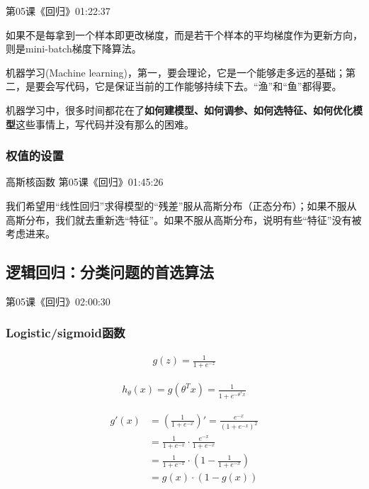 \documentclass[UTF8]{ctexbook}
\begin{document}
第05课《回归》01:22:37

如果不是每拿到一个样本即更改梯度，而是若干个样本的平均梯度作为更新方向，则是mini-batch梯度下降算法。

机器学习(Machine learning)，第一，要会理论，它是一个能够走多远的基础；第二，是要会写代码，它是保证当前的工作能够持续下去。“渔”和“鱼”都得要。

机器学习中，很多时间都花在了\textbf{如何建模型、如何调参、如何选特征、如何优化模型}这些事情上，写代码并没有那么的困难。

\subsubsection{权值的设置}

高斯核函数 第05课《回归》01:45:26

我们希望用“线性回归”求得模型的“残差”服从高斯分布（正态分布）；如果不服从高斯分布，我们就去重新选“特征”。如果不服从高斯分布，说明有些“特征”没有被考虑进来。


\subsection{逻辑回归：分类问题的首选算法}

第05课《回归》02:00:30

\subsubsection{Logistic/sigmoid函数}


 \begin{equation}
\begin{aligned}
g(z)=\frac{1}{1+e^{-z}}
\end{aligned}
\end{equation}

 \begin{equation}
\begin{aligned}
h_{\theta}(x)=g(\theta^{T}x)=\frac{1}{1+e^{-\theta^{T}x}}
\end{aligned}
\end{equation}

 \begin{equation}
\begin{aligned}
g'(x)&=(\frac{1}{1+e^{-x}})'=\frac{e^{-x}}{(1+e^{-x})^{2}}\\
&=\frac{1}{1+e^{-x}} \cdot \frac{e^{-x}}{1+e^{-x}}\\
&=\frac{1}{1+e^{-x}} \cdot (1- \frac{1}{1+e^{-x}})\\
&=g(x) \cdot (1-g(x))
\end{aligned}
\end{equation}
\end{document}
